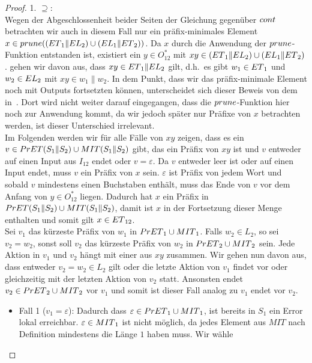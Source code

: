 \begin{proof}
  1. \glqq $\supseteq$\grqq :\\
  Wegen der Abgeschlossenheit beider Seiten der Gleichung gegenüber $cont{}$
  betrachten wir auch in diesem Fall nur ein präfix-minimales Element $x\in
  prune{}((ET{}_1\|EL{}_2)\cup (EL{}_1\|ET{}_2))$. Da $x$ durch die Anwendung der
  $prune{}$-Funktion entstanden ist, existiert ein $y\in O_{12}^*$ mit
  $xy\in(ET{}_1\|EL{}_2)\cup (EL{}_1\|ET{}_2)$. \OBdA{} gehen wir davon aus, dass
  $xy\in ET{}_1\|EL{}_2$ gilt, d.h.\ es gibt $w_1\in ET{}_1$ und $w_2\in EL{}_2$ mit
  $xy\in w_1\|w_2$. In dem Punkt, dass wir das präfix-minimale Element noch mit
  Outputs fortsetzten können, unterscheidet sich dieser Beweis von dem
  in~\cite{Schlosser2012BA}. Dort wird nicht weiter darauf eingegangen, dass
  die $prune{}$-Funktion hier noch zur Anwendung kommt, da wir jedoch später nur
  Präfixe von $x$ betrachten werden, ist dieser Unterschied irrelevant.\\
  Im Folgenden werden wir für alle Fälle von $xy$ zeigen, dass es ein $v\in
  PrET{}(S_1\|S_2)\cup MIT{}(S_1\|S_2)$ gibt, das ein Präfix von $xy$ ist und $v$
  entweder auf einen Input aus $I_{12}$ endet oder $v = \varepsilon$. Da $v$
  entweder leer ist oder auf einen Input endet, muss $v$ ein Präfix von $x$
  sein. $\varepsilon$ ist Präfix von jedem Wort und sobald $v$ mindestens einen
  Buchstaben enthält, muss das Ende von $v$ vor dem Anfang von $y\in O_{12}^*$
  liegen. Dadurch hat $x$ ein Präfix in $PrET{}(S_1\|S_2)\cup
  MIT{}(S_1\|S_2)$, damit ist $x$ in
  der Fortsetzung dieser Menge enthalten und somit gilt $x\in ET{}_{12}$.\\
  Sei $v_1$ das kürzeste Präfix von $w_1$ in $PrET{}_1\cup MIT{}_1$. Falls
  $w_2\in L_2$, so sei $v_2=w_2$, sonst soll $v_2$ das kürzeste Präfix von
  $w_2$ in $PrET{}_2\cup MIT{}_2$ sein. Jede Aktion in $v_1$ und $v_2$ hängt mit
  einer aus $xy$ zusammen. Wir gehen nun davon aus, dass entweder
  $v_2=w_2\in L_2$ gilt oder die letzte Aktion von $v_1$ findet vor oder
  gleichzeitig mit der letzten Aktion von $v_2$ statt. Ansonsten endet
  $v_2\in PrET{}_2\cup MIT{}_2$ vor $v_1$ und somit ist dieser Fall analog zu $v_1$
  endet vor $v_2$.
  \begin{itemize}
    \item Fall 1 ($v_1=\varepsilon$): Dadurch dass $\varepsilon\in PrET{}_1\cup
      MIT{}_1$, ist bereits in $S_1$ ein Error lokal erreichbar. $\varepsilon\in
      MIT{}_1$ ist nicht möglich, da jedes Element aus $MIT$ nach Definition
      mindestens die Länge $1$ haben muss. Wir wähle

\end{itemize}
\end{proof}
